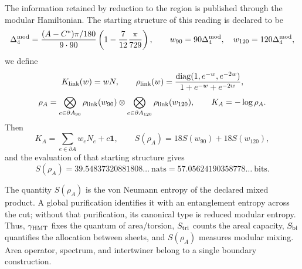 The information retained by reduction to the region is published through the
modular Hamiltonian. The starting structure of this reading is declared to be
\[
 \Delta_4^{\rm mod}
 =\frac{(A-C^*)\pi/180}{9\cdot90}
 \left(1-\frac7{12}\frac\pi{729}\right),
 \qquad w_{90}=90\Delta_4^{\rm mod},\quad
 w_{120}=120\Delta_4^{\rm mod},
\]
we define
\[
 K_{\rm link}(w)=wN,
 \qquad
 \rho_{\rm link}(w)=
 \frac{\operatorname{diag}(1,e^{-w},e^{-2w})}
 {1+e^{-w}+e^{-2w}},
\]
\begin{equation}
 \rho_A=
 \bigotimes_{e\in\partial A_{90}}\rho_{\rm link}(w_{90})
 \otimes
 \bigotimes_{e\in\partial A_{120}}\rho_{\rm link}(w_{120}),
 \qquad K_A=-\log\rho_A.
 \label{hap:eq:estado-hamiltoniano-modular-barbero-rev11}
\end{equation}
Then
\[
 K_A=\sum_{e\in\partial A}w_eN_e+c\mathbf1,
 \qquad
 S(\rho_A)=18S(w_{90})+18S(w_{120}),
\]
and the evaluation of that starting structure gives
\[
 S(\rho_A)=39.54837320881808\ldots\ \text{nats}
 =57.05624190358778\ldots\ \text{bits}.
\]

The quantity \(S(\rho_A)\) is the von Neumann entropy of the declared mixed
product. A global purification identifies it with an entanglement entropy
across the cut; without that purification, its canonical type is
reduced modular entropy. Thus, \(\gamma_{\rm HMT}\) fixes the quantum of
area/torsion, \(S_{\rm tri}\) counts the areal capacity, \(S_{\rm bi}\)
quantifies the allocation between sheets, and \(S(\rho_A)\) measures modular mixing.
Area operator, spectrum, and intertwiner belong to a single boundary
construction.
